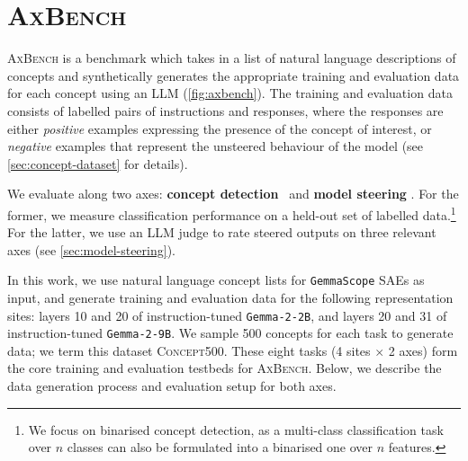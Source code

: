 \documentclass{article}
\theoremstyle{plain}
\theoremstyle{definition}
\theoremstyle{remark}
\newcommand{\shortbenchmark}{\textsc{AxBench}}
\newcommand{\methodtag}[2]{%
  \tikz[baseline=(char.base)]{%
    \node[
      fill=#1,
      rounded corners=2pt,
      text=white,
      font=\bfseries,
      minimum width=1em,
      minimum height=1em,
      align=center,
      inner sep=0pt
    ](char){#2};%
  }%
}
\newcommand{\concepttag}{\protect\methodtag{conceptcolor}{C}}
\newcommand{\steeringtag}{\protect\methodtag{steeringcolor}{S}}
\begin{document}
\section{\textbf{\shortbenchmark{}}}

\shortbenchmark{} is a benchmark which takes in a list of natural language descriptions of concepts and synthetically generates the appropriate training and evaluation data for each concept using an LLM (\cref{fig:axbench}). The training and evaluation data consists of labelled pairs of instructions and responses, where the responses are either \textit{positive} examples expressing the presence of the concept of interest, or \textit{negative} examples that represent the unsteered behaviour of the model (see \cref{sec:concept-dataset} for details).

We evaluate along two axes: \textbf{concept detection} \concepttag\ and \textbf{model steering} \steeringtag{}. For the former, we measure classification performance on a held-out set of labelled data.\footnote{We focus on binarised concept detection, as a multi-class classification task over $n$ classes can also be formulated into a binarised one over $n$ features.} For the latter, we use an LLM judge to rate steered outputs on three relevant axes (see \cref{sec:model-steering}).

In this work, we use natural language concept lists for \texttt{GemmaScope} SAEs as input, and generate training and evaluation data for the following representation sites: layers 10 and 20 of instruction-tuned \texttt{Gemma-2-2B}, and layers 20 and 31 of instruction-tuned \texttt{Gemma-2-9B}. We sample 500
concepts for each task to generate data; we term this dataset \textsc{Concept500}. These eight tasks (4 sites $\times$ 2 axes) form the core training and evaluation testbeds for \shortbenchmark{}.
Below, we describe the data generation process and evaluation setup for both axes.

\end{document}
